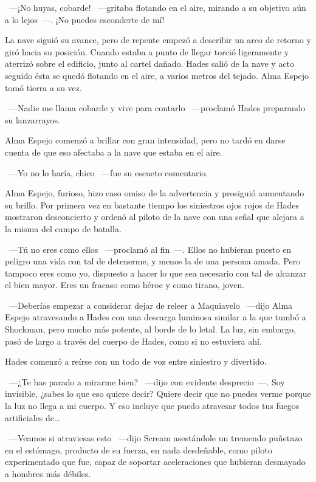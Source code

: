~---¡No huyas, cobarde! ~---gritaba flotando en el aire, mirando a su objetivo aún a lo lejos~---. ¡No puedes esconderte de mí!

La nave siguió su avance, pero de repente empezó a describir un arco de retorno y giró hacia su posición. Cuando estaba a punto de llegar torció ligeramente y aterrizó sobre el edificio, junto al cartel dañado. Hades salió de la nave y acto seguido ésta se quedó flotando en el aire, a varios metros del tejado. Alma Espejo tomó tierra a su vez.

~---Nadie me llama cobarde y vive para contarlo ~---proclamó Hades preparando su lanzarrayos.

Alma Espejo comenzó a brillar con gran intensidad, pero no tardó en darse cuenta de que eso afectaba a la nave que estaba en el aire.

~---Yo no lo haría, chico ~---fue su escueto comentario.

Alma Espejo, furioso, hizo caso omiso de la advertencia y prosiguió aumentando su brillo. Por primera vez en bastante tiempo los siniestros ojos rojos de Hades mostraron desconcierto y ordenó al piloto de la nave con una señal que alejara a la misma del campo de batalla.

~---Tú no eres como ellos ~---proclamó al fin~---. Ellos no hubieran puesto en peligro una vida con tal de detenerme, y menos la de una persona amada. Pero tampoco eres como yo, dispuesto a hacer lo que sea necesario con tal de alcanzar el bien mayor. Eres un fracaso como héroe y como tirano, joven.

~---Deberías empezar a considerar dejar de releer a Maquiavelo ~---dijo Alma Espejo atravesando a Hades con una descarga luminosa similar a la que tumbó a Shockman, pero mucho más potente, al borde de lo letal. La luz, sin embargo, pasó de largo a través del cuerpo de Hades, como si no estuviera ahí.

Hades comenzó a reírse con un todo de voz entre siniestro y divertido.

~---¿Te has parado a mirarme bien? ~---dijo con evidente desprecio~---. Soy invisible, ¿sabes lo que eso quiere decir? Quiere decir que no puedes verme porque la luz no llega a mi cuerpo. Y eso incluye que puedo atravesar todos tus fuegos artificiales de\dots

~---Veamos si atraviesas esto ~---dijo Scream asestándole un tremendo puñetazo en el estómago, producto de su fuerza, en nada desdeñable, como piloto experimentado que fue, capaz de soportar aceleraciones que hubieran desmayado a hombres más débiles.

